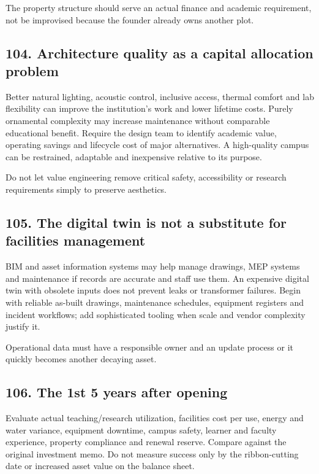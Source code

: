 The property structure should serve an actual finance and academic requirement, not be improvised because the founder already owns another plot.


\subsection{104. Architecture quality as a capital allocation problem}

Better natural lighting, acoustic control, inclusive access, thermal comfort and lab flexibility can improve the institution's work and lower lifetime costs. Purely ornamental complexity may increase maintenance without comparable educational benefit. Require the design team to identify academic value, operating savings and lifecycle cost of major alternatives. A high-quality campus can be restrained, adaptable and inexpensive relative to its purpose.

Do not let value engineering remove critical safety, accessibility or research requirements simply to preserve aesthetics.


\subsection{105. The digital twin is not a substitute for facilities management}

BIM and asset information systems may help manage drawings, MEP systems and maintenance if records are accurate and staff use them. An expensive digital twin with obsolete inputs does not prevent leaks or transformer failures. Begin with reliable as-built drawings, maintenance schedules, equipment registers and incident workflows; add sophisticated tooling when scale and vendor complexity justify it.

Operational data must have a responsible owner and an update process or it quickly becomes another decaying asset.


\subsection{106. The 1st 5 years after opening}

Evaluate actual teaching/research utilization, facilities cost per use, energy and water variance, equipment downtime, campus safety, learner and faculty experience, property compliance and renewal reserve. Compare against the original investment memo. Do not measure success only by the ribbon-cutting date or increased asset value on the balance sheet.


